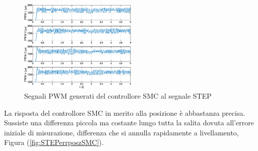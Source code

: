 \begin{figure}
	\centering
	\includegraphics[width=0.5\textwidth]{Simulazioni/Figure/SMC/STEP/PWM}
	\caption{Segnali PWM generati del controllore SMC al segnale STEP}
	\label{fig:STEPPWMSMC}
\end{figure}

La risposta del controllore SMC in merito alla posizione è abbastanza precisa. Sussiste una differenza piccola ma costante lungo tutta la salita dovuta all'errore iniziale di misurazione, differenza che si annulla rapidamente a livellamento, Figura (\ref{fig:STEPerrposzSMC}).

